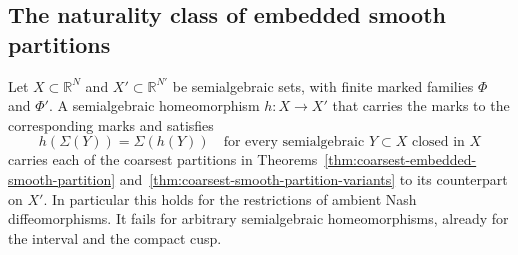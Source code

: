 \subsection{The naturality class of embedded smooth partitions}
\label{subsec:embedded-smooth-naturality}

\begin{proposition}
\label{prop:embedded-smooth-partition-naturality}
Let $X\subset\mathbb R^N$ and $X'\subset\mathbb R^{N'}$ be
semialgebraic sets, with finite marked families $\Phi$ and $\Phi'$.
A semialgebraic homeomorphism $h:X\to X'$ that carries the marks to
the corresponding marks and satisfies
\[
 h(\Sigma(Y))=\Sigma(h(Y))
 \quad\text{for every semialgebraic }Y\subset X
 \text{ closed in }X
\]
carries each of the coarsest partitions in
Theorems~\ref{thm:coarsest-embedded-smooth-partition}
and~\ref{thm:coarsest-smooth-partition-variants} to its counterpart
on $X'$.  In particular this holds for the restrictions of ambient
Nash diffeomorphisms.  It fails for arbitrary semialgebraic
homeomorphisms, already for the interval and the compact cusp.
\end{proposition}

